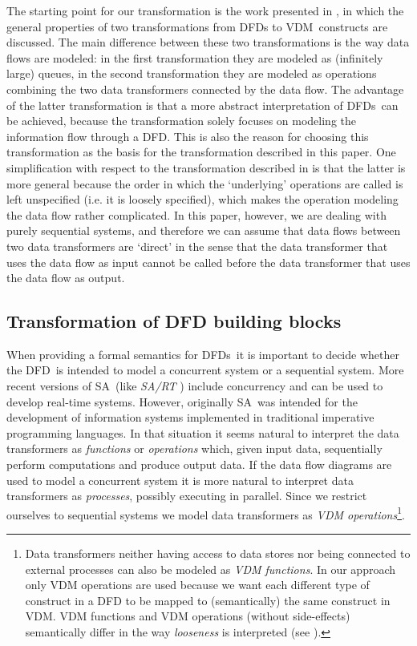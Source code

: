 \documentclass[11pt]{article}
\newcommand{\SA}{{\small SA}}
\newcommand{\VDM}{{\small VDM}}
\newcommand{\DFD}{{\small DFD}}
\newcommand{\DFDs}{{\small DFD}s}
\begin{document}
The starting point for our transformation is the work presented in
\cite{Plat&91a}, in which the general properties of two transformations from
DFDs to \VDM\ constructs are discussed.
The main difference between these two transformations is the way data flows are
modeled: in the first transformation they are modeled as (infinitely large)
queues, in the second transformation they are modeled as operations combining
the two data transformers connected by the data flow.
The advantage of the latter transformation is that a more abstract
interpretation of \DFDs\ can be achieved, because the transformation
solely focuses on modeling the information flow through a \DFD.
This is also the reason for choosing this transformation 
as the basis for the transformation described in this paper.
One simplification with respect to the transformation described in
\cite{Plat&91a} is that the latter is
more general because the order
in which the `underlying' operations are called is left unspecified
(i.e. it is loosely specified),
which makes the operation modeling the data flow rather complicated.
In this paper, however, we are dealing with purely sequential systems,
and therefore we can assume that data flows between two
data transformers are `direct' in the sense that 
the data transformer that uses the data flow as input cannot be
called before the data transformer that uses the data flow as output.

\subsection{Transformation of DFD building blocks}


When providing a formal semantics for \DFDs\ it is
important to decide whether the \DFD\ is intended to model
a concurrent system or a sequential system. More recent versions
of \SA\ (like {\em SA/RT} \cite{Ward85}) include concurrency and can be
used to develop real-time systems. However, originally \SA\
was intended for the development of information systems
implemented in traditional imperative programming languages.
In that situation it seems natural to interpret the data transformers
as {\em functions} or
{\em operations} which, given input data, sequentially perform computations and
produce output data.
If the data flow diagrams are used to model a concurrent system
it is more natural to interpret data transformers as {\em processes},
possibly executing in parallel.
Since we restrict ourselves to sequential systems we model data transformers
as {\em VDM operations}\footnote{Data transformers neither having access to
data stores nor being connected to external processes can also be modeled
as {\em VDM functions}. In our approach only {\tiny VDM}
operations are used because
we want each different type of construct in a {\tiny DFD} to be mapped to 
(semantically) the same construct in {\tiny VDM}.
{\tiny VDM} functions and {\tiny VDM} operations
(without side-effects) semantically differ in the way {\em looseness} is interpreted
(see \cite{IFIP}).}.
\end{document}
